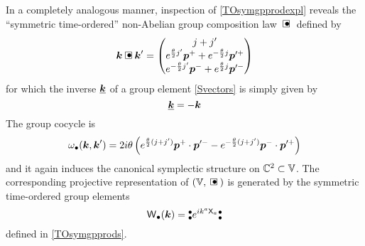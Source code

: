 In a completely analogous manner, inspection of \eqref{TOsymgpprodexpl} reveals
the ``symmetric time-ordered'' non-Abelian group composition law $\compb$
defined by
\begin{equation}
  \label{TOsymcomplaw}
  \mk\compb\mk'=\begin{pmatrix}j+j' \\ e^{\frac{\theta}2 j'} \mbp^++
    e^{-\frac{\theta}2 j} \mbp^{\prime +} \\ e^{-\frac{\theta}2 j'} 
    \mbp^-+ e^{\frac{\theta}2 j} \mbp^{\prime -} \end{pmatrix}
\end{equation}
for which the inverse $\underline{{{\boldsymbol {k} }}}$ of a group element \eqref{Svectors} is
simply given by
\begin{equation}
  \label{TOsyminverse}
  \underline{{{\boldsymbol {k} }}}=-{{\boldsymbol {k} }}
\end{equation}
The group cocycle is
\begin{equation}
  \label{TOsymcocycle}
  \omega_\bullet({{\boldsymbol {k} }},{{\boldsymbol {k} }}' )=2 i\theta \left( e^{\frac{\theta}2 
      (j+j' )} {{\boldsymbol {p} }}^+\cdot{{\boldsymbol {p} }}^{\prime -}- e^{-\frac{\theta}2 
      (j+j' )} {{\boldsymbol {p} }}^-\cdot{{\boldsymbol {p} }}^{\prime +}\right)
\end{equation}
and it again induces the canonical symplectic structure on
${\mathbb C}^2\subset{\mathbb V}$. The corresponding projective representation of
$(\mbbV,\compb)$ is generated by the symmetric time-ordered group elements
\begin{equation}
  \label{TOsymweylop}
  \operatorname{{\sf W}}_\bullet({{\boldsymbol {k} }})=\mbox{$\substack{\bullet\\\bullet}$}  e^{ i k^a {\sf X}_a} \mbox{$\substack{\bullet\\\bullet}$}
\end{equation}
defined in \eqref{TOsymgpprods}.

